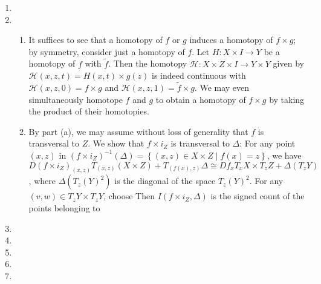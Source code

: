 \documentclass[11pt,leqno]{article}
\theoremstyle{plain}
\theoremstyle{definition}
\numberwithin{equation}{section}
\numberwithin{lem}{section}
\newcommand{\cbr}[1]{\left\{#1\right\}}
\begin{document}
\begin{enumerate}
    \item 
    \item \begin{enumerate}
      \item It suffices to see that a homotopy of $f$ or $g$ induces a homotopy of $f\times g$; by symmetry, consider just a homotopy of $f$. Let $H\colon X\times I\to Y$ be a homotopy of $f$ with $\tilde f$. Then the homotopy $\mathcal H\colon X\times Z\times I\to Y\times Y$ given by $\mathcal H(x,z,t) = H(x,t)\times g(z)$ is indeed continuous with $\mathcal H(x,z,0) = f\times g$ and $\mathcal H(x,z,1) = \tilde f\times g$. We may even simultaneously homotope $f$ and $g$ to obtain a homotopy of $f\times g$ by taking the product of their homotopies.
      \item By part (a), we may assume without loss of generality that $f$ is transversal to $Z$. We show that $f\times i_Z$ is transversal to $\Delta$: For any point $(x,z)$ in $(f\times i_Z)^{-1}(\Delta) = \cbr{(x,z)\in X\times Z\mid f(x) = z}$, we have $D(f\times i_Z)_{(x,z)}T_{(x,z)}(X\times Z) + T_{(f(x),z)}\Delta \cong Df_xT_xX \times T_zZ + \Delta(T_{z}Y)$, where $\Delta(T_z(Y)^2)$ is the diagonal of the space $T_z(Y)^2$. For any $(v,w)\in T_zY\times T_zY$, choose  Then $I(f\times i_Z, \Delta)$ is the signed count of the points belonging to 
    \end{enumerate}
    \item 
    \item 
    \item 
    \item 
    \item 
\end{enumerate}
\end{document}
